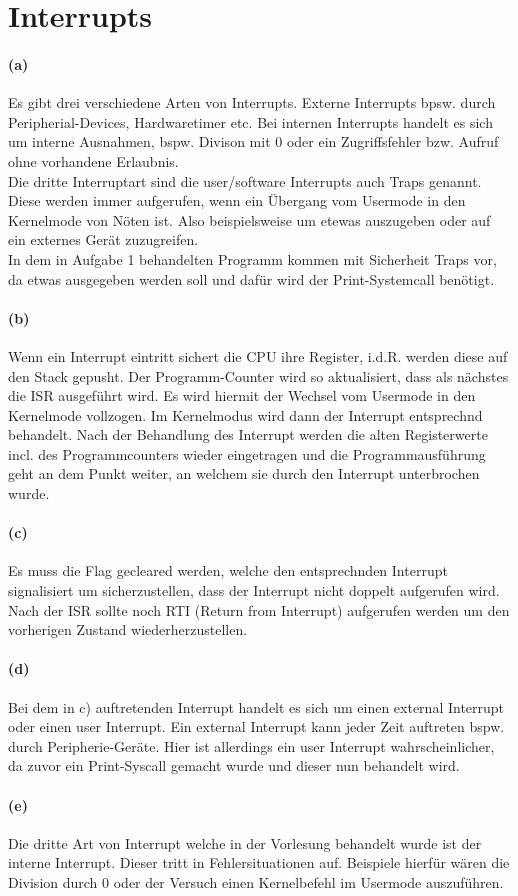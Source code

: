 \documentclass[a4paper]{article}
\begin{document}
\section{Interrupts}


\paragraph{(a)}
Es gibt drei verschiedene Arten von Interrupts. Externe Interrupts bpsw. durch Peripherial-Devices, Hardwaretimer etc. Bei internen Interrupts handelt es sich um interne Ausnahmen, bspw. Divison mit 0 oder ein Zugriffsfehler bzw. Aufruf ohne vorhandene Erlaubnis.\\
Die dritte Interruptart sind die user/software Interrupts auch Traps genannt. Diese werden immer aufgerufen, wenn ein Übergang vom Usermode in den Kernelmode von Nöten ist. Also beispielsweise um etewas auszugeben oder auf ein externes Gerät zuzugreifen.\\
In dem in Aufgabe 1 behandelten Programm kommen mit Sicherheit Traps vor, da etwas ausgegeben werden soll und dafür wird der Print-Systemcall benötigt.

\paragraph{(b)}
Wenn ein Interrupt eintritt sichert die CPU ihre Register, i.d.R. werden diese auf den Stack gepusht. Der Programm-Counter wird so aktualisiert, dass als nächstes die ISR ausgeführt wird. Es wird hiermit der Wechsel vom Usermode in den Kernelmode vollzogen. Im Kernelmodus wird dann der Interrupt entsprechnd behandelt. Nach der Behandlung des Interrupt werden die alten Registerwerte incl. des Programmcounters wieder eingetragen und die Programmausführung geht an dem Punkt weiter, an welchem sie durch den Interrupt unterbrochen wurde.

\paragraph{(c)}
Es muss die Flag gecleared werden, welche den entsprechnden Interrupt signalisiert um sicherzustellen, dass der Interrupt nicht doppelt aufgerufen wird. \\
Nach der ISR sollte noch RTI (Return from Interrupt) aufgerufen werden um den vorherigen Zustand wiederherzustellen.

\paragraph{(d)}
Bei dem in c) auftretenden Interrupt handelt es sich um einen external Interrupt oder einen user Interrupt. Ein external Interrupt kann jeder Zeit auftreten bspw. durch Peripherie-Geräte. Hier ist allerdings ein user Interrupt wahrscheinlicher, da zuvor ein Print-Syscall gemacht wurde und dieser nun behandelt wird. 

\paragraph{(e)}
Die dritte Art von Interrupt welche in der Vorlesung behandelt wurde ist der interne Interrupt. Dieser tritt in Fehlersituationen auf. Beispiele hierfür wären die Division durch 0 oder der Versuch einen Kernelbefehl im Usermode auszuführen.
\end{document}
